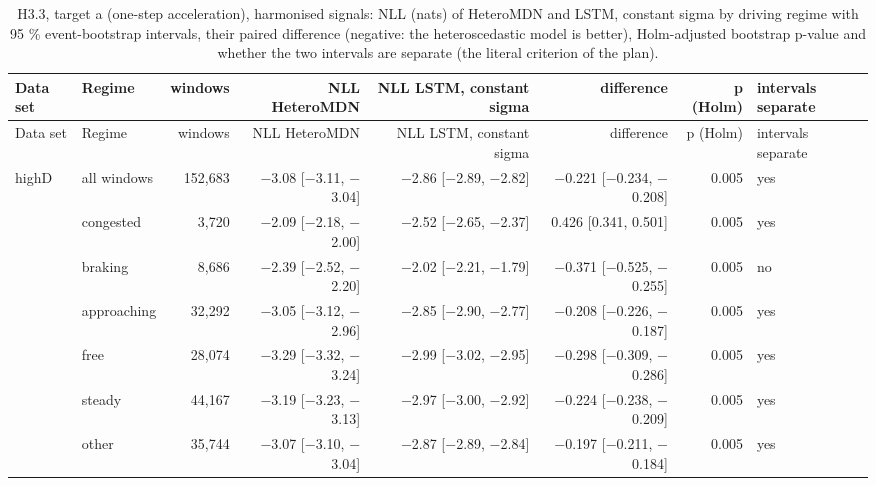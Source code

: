 \begingroup
\footnotesize
\begin{longtable}{llrrrrrl}
\caption{H3.3, target a (one-step acceleration), harmonised signals: NLL (nats) of HeteroMDN and LSTM, constant sigma by driving regime with 95 \% event-bootstrap intervals, their paired difference (negative: the heteroscedastic model is better), Holm-adjusted bootstrap p-value and whether the two intervals are separate (the literal criterion of the plan).}\label{tab:t3-h33-nll--harmonised--a} \\
\toprule
Data set & Regime & windows & NLL HeteroMDN & NLL LSTM, constant sigma & difference & p (Holm) & intervals separate \\
\midrule
\endfirsthead
\toprule
Data set & Regime & windows & NLL HeteroMDN & NLL LSTM, constant sigma & difference & p (Holm) & intervals separate \\
\midrule
\endhead
\bottomrule
\endlastfoot
highD & all windows & 152,683 & $-$3.08 [$-$3.11, $-$3.04] & $-$2.86 [$-$2.89, $-$2.82] & $-$0.221 [$-$0.234, $-$0.208] & 0.005 & yes \\
 & congested & 3,720 & $-$2.09 [$-$2.18, $-$2.00] & $-$2.52 [$-$2.65, $-$2.37] & 0.426 [0.341, 0.501] & 0.005 & yes \\
 & braking & 8,686 & $-$2.39 [$-$2.52, $-$2.20] & $-$2.02 [$-$2.21, $-$1.79] & $-$0.371 [$-$0.525, $-$0.255] & 0.005 & no \\
 & approaching & 32,292 & $-$3.05 [$-$3.12, $-$2.96] & $-$2.85 [$-$2.90, $-$2.77] & $-$0.208 [$-$0.226, $-$0.187] & 0.005 & yes \\
 & free & 28,074 & $-$3.29 [$-$3.32, $-$3.24] & $-$2.99 [$-$3.02, $-$2.95] & $-$0.298 [$-$0.309, $-$0.286] & 0.005 & yes \\
 & steady & 44,167 & $-$3.19 [$-$3.23, $-$3.13] & $-$2.97 [$-$3.00, $-$2.92] & $-$0.224 [$-$0.238, $-$0.209] & 0.005 & yes \\
 & other & 35,744 & $-$3.07 [$-$3.10, $-$3.04] & $-$2.87 [$-$2.89, $-$2.84] & $-$0.197 [$-$0.211, $-$0.184] & 0.005 & yes \\
\midrule

\end{longtable}
